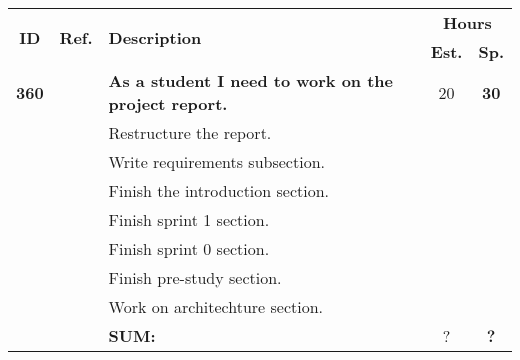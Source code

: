 \label{tab:sprint2Documentationstories}
\def\arraystretch{1.25}
 
\begin{longtable}{ccXcc}

\toprule[0.5mm]
\multirow{2}{*}{\textbf{ID}} &
\multirow{2}{*}{\textbf{Ref.}} & \multirow{2}{*}{\textbf{Description}} & \multicolumn{2}{c}{\textbf{Hours}} \\
 					& & & \textbf{Est.} & \textbf{Sp.} \\
\midrule
\textbf{360} 	& {}
	& {\bf As a student I need to work on the project report.} 	& 	20	& \textbf{ 30} \\
				&& Restructure the report.	&  &  \\
				&& Write requirements subsection.	&  &  \\
				&& Finish the introduction section.	&  & \\
				&& Finish sprint 1 section.	&  &  \\
				&& Finish sprint 0 section.	&  &  \\
				&& Finish pre-study section.	&  &  \\
				&& Work on architechture section.	&  &  \\
							
				
\hline
				&& \textbf{SUM:}		&		?	& \textbf{?}
 \\																			
\bottomrule[0.5mm]
\end{longtable}
